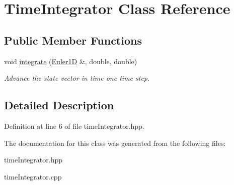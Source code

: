 \hypertarget{classTimeIntegrator}{}\section{Time\+Integrator Class Reference}
\label{classTimeIntegrator}
\subsection*{Public Member Functions}
\begin{DoxyCompactItemize}
\item 
\mbox{\label{classTimeIntegrator_a149210898e4a69f72e976073d6a17deb}} 
void \hyperlink{classTimeIntegrator_a149210898e4a69f72e976073d6a17deb}{integrate} (\hyperlink{classEuler1D}{Euler1D} \&, double, double)
\begin{DoxyCompactList}\small\item\em Advance the state vector in time one time step. \end{DoxyCompactList}\end{DoxyCompactItemize}


\subsection{Detailed Description}


Definition at line 6 of file time\+Integrator.\+hpp.



The documentation for this class was generated from the following files\+:\begin{DoxyCompactItemize}
\item 
time\+Integrator.\+hpp\item 
time\+Integrator.\+cpp\end{DoxyCompactItemize}
